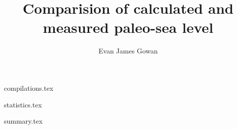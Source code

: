 \documentclass[a4paper,12pt]{article}
\begin{document}
\title{Comparision of calculated and measured paleo-sea level}

\author{Evan James Gowan}
    
\date{}

\maketitle

\tableofcontents

\newpage

{compilations.tex}

\newpage

{statistics.tex}


\newpage

{summary.tex}

\clearpage

\newpage



\end{document}
